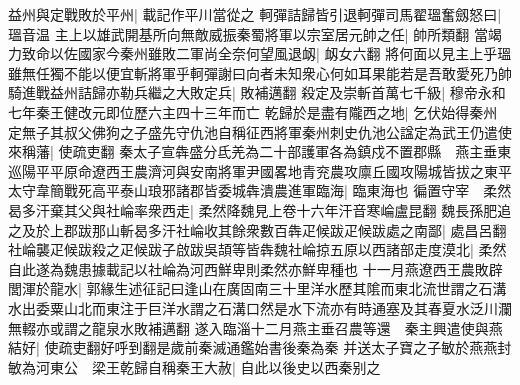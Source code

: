 益州與定戰敗於平州|{
	載記作平川當從之}
軻彈詰歸皆引退軻彈司馬翟瑥奮劔怒曰|{
	瑥音温}
主上以雄武開基所向無敵威振秦蜀將軍以宗室居元帥之任|{
	帥所類翻}
當竭力致命以佐國家今秦州雖敗二軍尚全奈何望風退衂|{
	衂女六翻}
將何面以見主上乎瑥雖無任獨不能以便宜斬將軍乎軻彈謝曰向者未知衆心何如耳果能若是吾敢愛死乃帥騎進戰益州詰歸亦勒兵繼之大敗定兵|{
	敗補邁翻}
殺定及崇斬首萬七千級|{
	穆帝永和七年秦王健改元即位歷六主四十三年而亡}
乾歸於是盡有隴西之地|{
	乞伏始得秦州}
定無子其叔父佛狗之子盛先守仇池自稱征西將軍秦州刺史仇池公諡定為武王仍遣使來稱藩|{
	使疏吏翻}
秦太子宣犇盛分氐羌為二十部護軍各為鎮戍不置郡縣　燕主垂東巡陽平平原命遼西王農濟河與安南將軍尹國畧地青兖農攻廪丘國攻陽城皆拔之東平太守韋簡戰死高平泰山琅邪諸郡皆委城犇潰農進軍臨海|{
	臨東海也}
徧置守宰　柔然曷多汗棄其父與社崘率衆西走|{
	柔然降魏見上卷十六年汗音寒崘盧昆翻}
魏長孫肥追之及於上郡跋那山斬曷多汗社崘收其餘衆數百犇疋候跋疋候跋處之南鄙|{
	處昌呂翻}
社崘襲疋候跋殺之疋候跋子啟跋吳頡等皆犇魏社崘掠五原以西諸部走度漠北|{
	柔然自此遂為魏患據載記以社崘為河西鮮卑則柔然亦鮮卑種也}
十一月燕遼西王農敗辟閭渾於龍水|{
	郭緣生述征記曰逢山在廣固南三十里洋水歷其隂而東北流世謂之石溝水出委粟山北而東注于巨洋水謂之石溝口然是水下流亦有時通塞及其春夏水泛川瀾無輟亦或謂之龍泉水敗補邁翻}
遂入臨淄十二月燕主垂召農等還　秦主興遣使與燕結好|{
	使疏吏翻好呼到翻是歲前秦滅通鑑始書後秦為秦}
并送太子寶之子敏於燕燕封敏為河東公　梁王乾歸自稱秦王大赦|{
	自此以後史以西秦别之}


